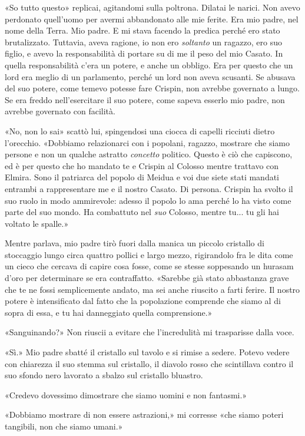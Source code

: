 «So tutto questo» replicai, agitandomi sulla poltrona. Dilatai le
narici. Non avevo perdonato quell'uomo per avermi abbandonato alle mie
ferite. Era mio padre, nel nome della Terra. Mio padre. E mi stava
facendo la predica perché ero stato brutalizzato. Tuttavia, aveva
ragione, io non ero \emph{soltanto} un ragazzo, ero suo figlio, e avevo
la responsabilità di portare su di me il peso del mio Casato. In quella
responsabilità c'era un potere, e anche un obbligo. Era per questo che
un lord era meglio di un parlamento, perché un lord non aveva scusanti.
Se abusava del suo potere, come temevo potesse fare Crispin, non avrebbe
governato a lungo. Se era freddo nell'esercitare il suo potere, come
sapeva esserlo mio padre, non avrebbe governato con facilità.

«No, non lo sai» scattò lui, spingendosi una ciocca di capelli ricciuti
dietro l'orecchio. «Dobbiamo relazionarci con i popolani, ragazzo,
mostrare che siamo persone e non un qualche astratto \emph{concetto}
politico. Questo è ciò che capiscono, ed è per questo che ho mandato te
e Crispin al Colosso mentre trattavo con Elmira. Sono il patriarca del
popolo di Meidua e voi due siete stati mandati entrambi a rappresentare
me e il nostro Casato. Di persona. Crispin ha svolto il suo ruolo in
modo ammirevole: adesso il popolo lo ama perché lo ha visto come parte
del suo mondo. Ha combattuto nel \emph{suo} Colosso, mentre tu... tu gli
hai voltato le spalle.»

Mentre parlava, mio padre tirò fuori dalla manica un piccolo cristallo
di stoccaggio lungo circa quattro pollici e largo mezzo, rigirandolo fra
le dita come un cieco che cercava di capire cosa fosse, come se stesse
soppesando un hurasam d'oro per determinare se era contraffatto.
«Sarebbe già stato abbastanza grave che te ne fossi semplicemente
andato, ma sei anche riuscito a farti ferire. Il nostro potere è
intensificato dal fatto che la popolazione comprende che siamo al di
sopra di essa, e tu hai danneggiato quella comprensione.»

«Sanguinando?» Non riuscii a evitare che l'incredulità mi trasparisse
dalla voce.

«Sì.» Mio padre sbatté il cristallo sul tavolo e si rimise a sedere.
Potevo vedere con chiarezza il suo stemma sul cristallo, il diavolo
rosso che scintillava contro il suo sfondo nero lavorato a sbalzo sul
cristallo bluastro.

«Credevo dovessimo dimostrare che siamo uomini e non fantasmi.»

«Dobbiamo mostrare di non essere astrazioni,» mi corresse «che siamo
poteri tangibili, non che siamo umani.»

